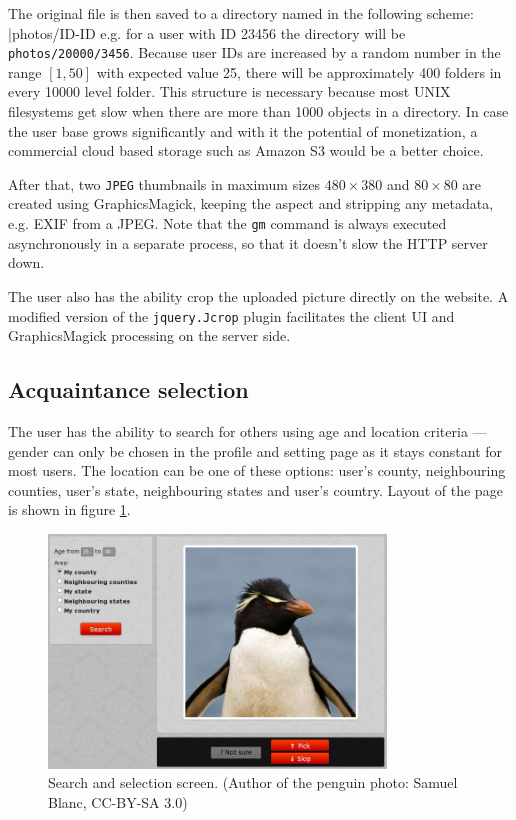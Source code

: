 \documentclass[12pt,oneside]{fithesis}
\begin{document}
		The original file is then saved to a directory named in the following scheme: 
		|photos/ID-ID%
		e.g. for a user with ID 23456 the directory will be \texttt{photos/20000/3456}. Because user IDs are increased by a random number in the range $\left[1,50\right]$ with expected value 25, there will be approximately 400 folders in every 10000 level folder. This structure is necessary because most UNIX filesystems get slow when there are more than 1000 objects in a directory. In case the user base grows significantly and with it the potential of monetization, a commercial cloud based storage such as Amazon S3 would be a better choice.
		
		After that, two \texttt{JPEG} thumbnails in maximum sizes $480\times 380$ and $80\times 80$ are created using GraphicsMagick, keeping the aspect and stripping any metadata, e.g. EXIF from a JPEG. Note that the \texttt{gm} command is always executed asynchronously in a separate process, so that it doesn't slow the HTTP server down.
		
		The user also has the ability crop the uploaded picture directly on the website. A modified version of the \texttt{jquery.Jcrop} plugin facilitates the client UI and GraphicsMagick processing on the server side.
		
	\subsection{Acquaintance selection}
		The user has the ability to search for others using age and location criteria --- gender can only be chosen in the profile and setting page as it stays constant for most users. The location can be one of these options: user's county, neighbouring counties, user's state, neighbouring states and user's country. Layout of the page is shown in figure \ref{fig:screen-search}.
		\begin{figure}[h]
	  \centering
	    \includegraphics[width=0.8\textwidth]{screen-search.png}
		  \caption{Search and selection screen. (Author of the penguin photo: Samuel Blanc, CC-BY-SA 3.0)}
		  \label{fig:screen-search}
	  \end{figure}
	  
\end{document}
